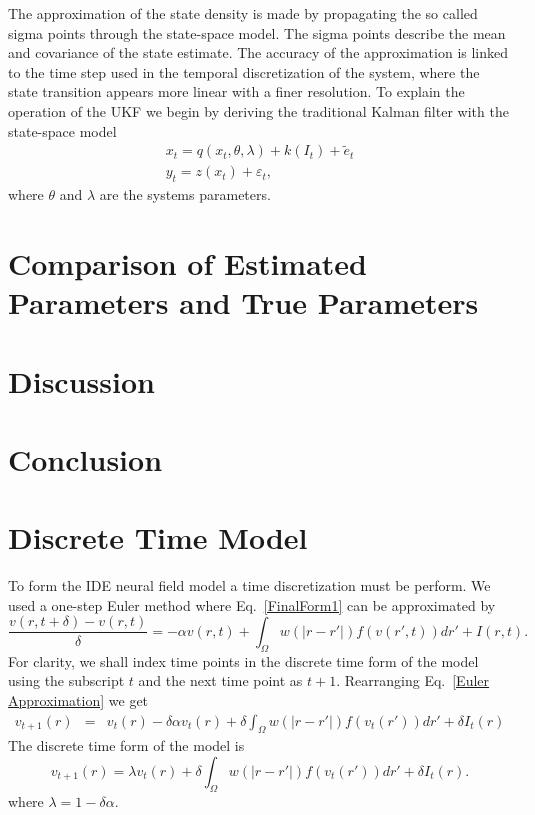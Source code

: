 \documentclass[onecolumn,draftcls]{IEEEtran}
\begin{document}
The approximation of the state density is made by propagating the so called sigma points through the state-space model. The sigma points describe the mean and covariance of the state estimate. The accuracy of the approximation is linked to the time step used in the temporal discretization of the system, where the state transition appears more linear with a finer resolution. To explain the operation of the UKF we begin by deriving the traditional Kalman filter with the state-space model
\begin{eqnarray}
	x_t = q(x_t,\theta,\lambda) + k(I_t) + \tilde{e}_t \\
	y_t = z(x_t) + \varepsilon_t,
\end{eqnarray}
where $\theta$ and $\lambda$ are the systems parameters. 

\section{Comparison of Estimated Parameters and True Parameters}

\section{Discussion}

\section{Conclusion}

\appendices

\section{Discrete Time Model}\label{Time Discretization}
To form the IDE neural field model a time discretization must be perform. We used a one-step Euler method where Eq.~\ref{FinalForm1} can be approximated by
\begin{equation}\label{Euler Approximation}	
\frac{v\left( r,t+\delta \right) - v\left( r,t\right)}{\delta} =   -\alpha v\left( r,t \right) + \int_\Omega  {w\left( |r-r'| \right)f\left( {v\left( r',t \right)} \right)dr'} + I\left(r,t\right).
\end{equation}
For clarity, we shall index time points in the discrete time form of the model using the subscript $t$ and the next time point as $t+1$. Rearranging Eq.~\ref{Euler Approximation} we get
\begin{eqnarray}\label{Euler Approximation}	
v_{t+1}\left( r\right) &=& v_t\left( r\right) -\delta \alpha v_t\left( r\right) + \delta \int_\Omega  {w\left( |r-r'| \right)f\left( {v_t\left( r'\right)} \right)dr'} + \delta I_t\left(r\right)
\end{eqnarray}
The discrete time form of the model is
\begin{equation}\label{Discrete Time Model1}
	v_{t+1}\left(r\right) = \lambda v_t\left(r\right) + \delta \int_\Omega { w\left(|r-r'|\right) f\left(v_t\left(r'\right)\right) dr'} + \delta I_t\left(r\right).
\end{equation}
where $\lambda = 1 - \delta \alpha$.
\end{document}
